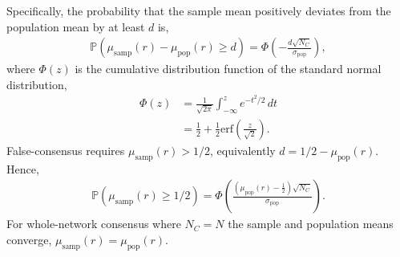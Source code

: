 Specifically, the probability that the sample mean positively deviates from the population mean by at least $d$ is,
\begin{align}
	\mathbb{P}(\mu_\mathrm{samp}(r)-\mu_\mathrm{pop}(r)\geq d) = \Phi\left(-\frac{d\sqrt{N_C}}{\sigma_\mathrm{pop}}\right)	,
\end{align}
where $\Phi(z)$ is the cumulative distribution function of the standard normal distribution,
\begin{align}
	\Phi(z) &= \frac{1}{\sqrt{2\pi}} \int_{-\infty}^z e^{-t^2/2}\,dt \nonumber\\
	&= \frac{1}{2} + \frac{1}{2} \mathrm{erf}\left(\frac{z}{\sqrt{2}}\right).
\end{align}
False-consensus requires \mbox{$\mu_\mathrm{samp}(r)>1/2$}, equivalently \mbox{$d=1/2-\mu_\mathrm{pop}(r)$}. Hence,
\begin{align}
	\mathbb{P}(\mu_\mathrm{samp}(r)\geq 1/2) = \Phi\left(\frac{\left(\mu_\mathrm{pop}(r)-\frac{1}{2}\right)\sqrt{N_C}}{\sigma_\mathrm{pop}}\right).
\end{align}
For whole-network consensus where \mbox{$N_C=N$} the sample and population means converge, \mbox{$\mu_\mathrm{samp}(r)=\mu_\mathrm{pop}(r)$}.


